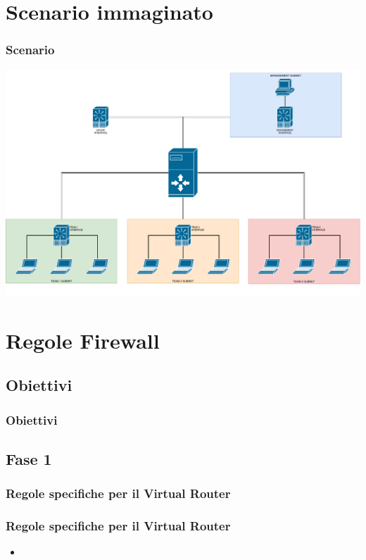 \documentclass{beamer}
\begin{document}
\section{Scenario immaginato}

\begin{frame}
    \frametitle{Scenario}

    \includegraphics[width=\textwidth]{competition.pdf}

\end{frame}

\section{Regole Firewall}
\subsection{Obiettivi}
\begin{frame}
    \frametitle{Obiettivi}

    

\end{frame}



\subsection{Fase 1}

\subsubsection{Regole specifiche per il Virtual Router}
\begin{frame}
    \frametitle{Regole specifiche per il Virtual Router}
    \begin{itemize}
        \item 
    \end{itemize}
\end{frame}
\end{document}
